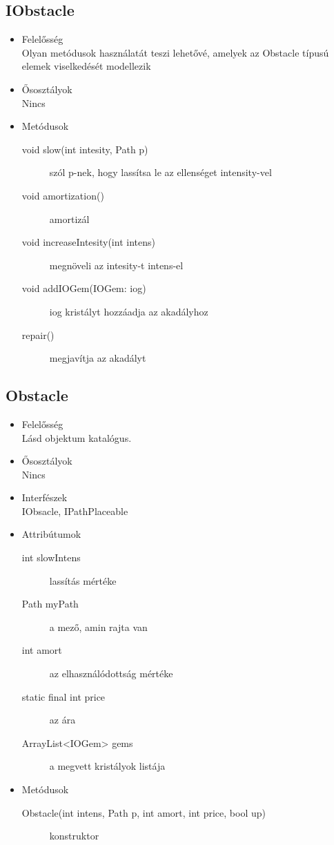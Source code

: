 \subsection{IObstacle}
\begin{itemize}
\item Felelősség\\
Olyan metódusok használatát teszi lehetővé, amelyek az Obstacle típusú elemek viselkedését modellezik
\item Ősosztályok\\
Nincs

\item Metódusok\\
	\begin{description}
		\item[void slow(int intesity, Path p)] szól p-nek, hogy lassítsa le az ellenséget intensity-vel
\item[void amortization()] amortizál
\item[void increaseIntesity(int intens)] megnöveli az intesity-t intens-el
\item[void addIOGem(IOGem: iog)] iog kristályt hozzáadja az akadályhoz
\item[repair()] megjavítja az akadályt


		
		
	\end{description}
\end{itemize}
\subsection{Obstacle}
\begin{itemize}
\item Felelősség\\
Lásd objektum katalógus. 
\item Ősosztályok\\
Nincs
\item Interfészek\\
IObsacle, IPathPlaceable
\item Attribútumok\\
	\begin{description}
	\item[int slowIntens] lassítás mértéke
\item[Path myPath] a mező, amin rajta van
\item[int amort] az elhasználódottság mértéke
\item[static final int price] az ára
\item[ArrayList<IOGem> gems] a megvett kristályok listája


	\end{description}
\item Metódusok\\
	\begin{description}
		
		\item[Obstacle(int intens, Path p, int amort, int price, bool up)] konstruktor
		
		
	\end{description}
\end{itemize}
